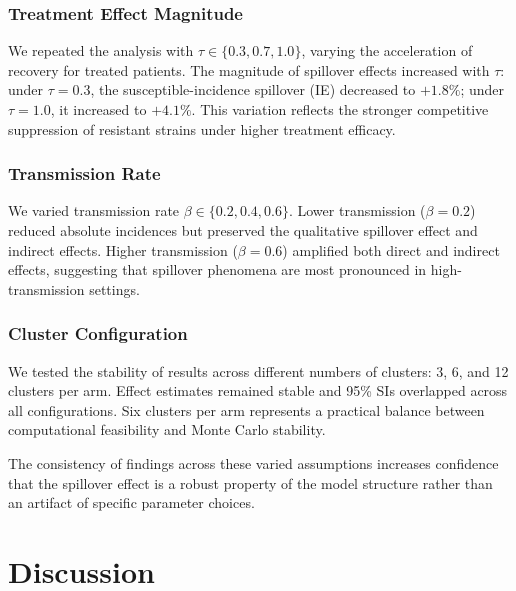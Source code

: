 \subsubsection{Treatment Effect Magnitude}
We repeated the analysis with $\tau \in \{0.3, 0.7, 1.0\}$, varying the acceleration of recovery for
treated patients. The magnitude of spillover effects increased with $\tau$: under $\tau = 0.3$, the
susceptible-incidence spillover (IE) decreased to $+1.8\%$; under $\tau = 1.0$, it increased to $+4.1\%$.
This variation reflects the stronger competitive suppression of resistant strains under higher treatment efficacy.

\subsubsection{Transmission Rate}
We varied transmission rate $\beta \in \{0.2, 0.4, 0.6\}$. Lower transmission ($\beta = 0.2$) reduced
absolute incidences but preserved the qualitative spillover effect and indirect effects. Higher transmission
($\beta = 0.6$) amplified both direct and indirect effects, suggesting that spillover phenomena are most
pronounced in high-transmission settings.

\subsubsection{Cluster Configuration}
We tested the stability of results across different numbers of clusters: 3, 6, and 12 clusters per arm.
Effect estimates remained stable and 95\% SIs overlapped across all configurations. Six clusters per arm
represents a practical balance between computational feasibility and Monte Carlo stability.

The consistency of findings across these varied assumptions increases confidence that the spillover effect
is a robust property of the model structure rather than an artifact of specific parameter choices.



\section{Discussion}

